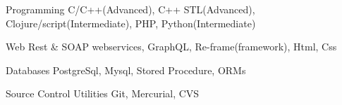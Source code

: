 

\begin{cvskills}

  \cvskill
    {Programming} %
    {C/C++(Advanced), C++ STL(Advanced), Clojure/script(Intermediate), PHP, Python(Intermediate)} %

  \cvskill
    {Web} %
    {Rest \& SOAP webservices, GraphQL, Re-frame(framework), Html, Css} %

  \cvskill
    {Databases} %
    {PostgreSql, Mysql, Stored Procedure, ORMs} %


  \cvskill
    {Source Control Utilities} %
    {Git, Mercurial, CVS} %

\end{cvskills}
